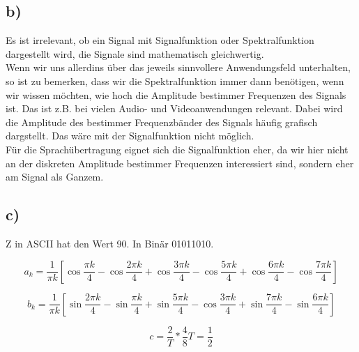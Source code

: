 \documentclass[a4paper,12pt]{scrartcl}
\begin{document}
\subsection{b)}
Es ist irrelevant, ob ein Signal mit Signalfunktion oder Spektralfunktion
dargestellt wird, die Signale sind mathematisch gleichwertig.\\

Wenn wir uns allerdins über das jeweils sinnvollere Anwendungsfeld unterhalten,
so ist zu bemerken, dass wir die Spektralfunktion immer dann benötigen,
wenn wir wissen möchten, wie hoch die Amplitude bestimmer Frequenzen des
Signals ist. Das ist z.B. bei vielen Audio- und Videoanwendungen relevant.
Dabei wird die Amplitude des bestimmer Frequenzbänder des Signals häufig
grafisch dargstellt. Das wäre mit der Signalfunktion nicht möglich.\\

Für die Sprachübertragung eignet sich die Signalfunktion eher, da wir hier
nicht an der diskreten Amplitude bestimmer Frequenzen interessiert sind,
sondern eher am Signal als Ganzem.

\subsection{c)}
Z in ASCII hat den Wert 90. In Binär 01011010.

\[ a_k=\frac{1}{\pi k} \left[\cos \frac{\pi k}{4} - \cos \frac{2 \pi k}{4} +
		\cos \frac{3 \pi k}{4} - \cos \frac{5 \pi k}{4} +
        \cos \frac{6 \pi k}{4} - \cos \frac{7 \pi k}{4} \right] \]

\[ b_k=\frac{1}{\pi k} \left[\sin \frac{2 \pi k}{4} - \sin \frac{\pi k}{4} +
		\sin \frac{5 \pi k}{4} - \cos \frac{3 \pi k}{4} +
        \sin \frac{7 \pi k}{4} - \sin \frac{6 \pi k}{4} \right] \]

\[ c=\frac{2}{T}*\frac{4}{8}T=\frac{1}{2} \]
\end{document}
